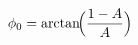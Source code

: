 \documentclass[border=1pt]{standalone}
\begin{document}
\fontsize{14}{16.8}\selectfont
\(\displaystyle \phi_0 = \arctan\!\Bigl(\frac{1-A}{A}\Bigr)\)
\end{document}
